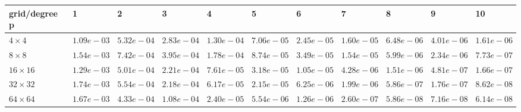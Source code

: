 \begin{tabular}{lllllllllll}
\hline
 grid/degree p   & 1          & 2          & 3          & 4          & 5          & 6          & 7          & 8          & 9          & 10         \\
\hline
 $4 \times 4$    & $1.09e-03$ & $5.32e-04$ & $2.83e-04$ & $1.30e-04$ & $7.06e-05$ & $2.45e-05$ & $1.60e-05$ & $6.48e-06$ & $4.01e-06$ & $1.61e-06$ \\
 $8 \times 8$    & $1.54e-03$ & $7.42e-04$ & $3.95e-04$ & $1.78e-04$ & $8.74e-05$ & $3.49e-05$ & $1.54e-05$ & $5.99e-06$ & $2.34e-06$ & $7.73e-07$ \\
 $16 \times 16$  & $1.29e-03$ & $5.01e-04$ & $2.21e-04$ & $7.61e-05$ & $3.18e-05$ & $1.05e-05$ & $4.28e-06$ & $1.51e-06$ & $4.81e-07$ & $1.66e-07$ \\
 $32 \times 32$  & $1.74e-03$ & $5.54e-04$ & $2.18e-04$ & $6.17e-05$ & $2.15e-05$ & $6.25e-06$ & $1.99e-06$ & $5.86e-07$ & $1.76e-07$ & $8.62e-08$ \\
 $64 \times 64$  & $1.67e-03$ & $4.33e-04$ & $1.08e-04$ & $2.40e-05$ & $5.54e-06$ & $1.26e-06$ & $2.60e-07$ & $5.86e-08$ & $7.16e-08$ & $6.14e-08$ \\
\hline
\end{tabular}